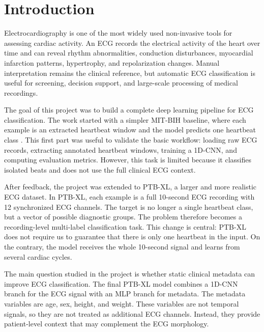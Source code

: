 \documentclass[11pt,a4paper]{article}
\begin{document}
\tableofcontents
\clearpage
{}

\section{Introduction}

Electrocardiography is one of the most widely used non-invasive tools for assessing cardiac activity. An ECG records the electrical activity of the heart over time and can reveal rhythm abnormalities, conduction disturbances, myocardial infarction patterns, hypertrophy, and repolarization changes. Manual interpretation remains the clinical reference, but automatic ECG classification is useful for screening, decision support, and large-scale processing of medical recordings.

The goal of this project was to build a complete deep learning pipeline for ECG classification. The work started with a simpler MIT-BIH baseline, where each example is an extracted heartbeat window and the model predicts one heartbeat class \cite{moody2001mitbih,goldberger2000physionet}. This first part was useful to validate the basic workflow: loading raw ECG records, extracting annotated heartbeat windows, training a 1D-CNN, and computing evaluation metrics. However, this task is limited because it classifies isolated beats and does not use the full clinical ECG context.

After feedback, the project was extended to PTB-XL, a larger and more realistic ECG dataset. In PTB-XL, each example is a full 10-second ECG recording with 12 synchronized ECG channels. The target is no longer a single heartbeat class, but a vector of possible diagnostic groups. The problem therefore becomes a recording-level multi-label classification task. This change is central: PTB-XL does not require us to guarantee that there is only one heartbeat in the input. On the contrary, the model receives the whole 10-second signal and learns from several cardiac cycles.

The main question studied in the project is whether static clinical metadata can improve ECG classification. The final PTB-XL model combines a 1D-CNN branch for the ECG signal with an MLP branch for metadata. The metadata variables are age, sex, height, and weight. These variables are not temporal signals, so they are not treated as additional ECG channels. Instead, they provide patient-level context that may complement the ECG morphology.
\end{document}
